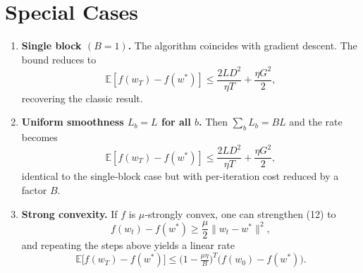\documentclass{article}
\newcommand{\E}{\mathbb{E}}
\begin{document}
\section*{Special Cases}
\begin{enumerate}[label=\arabic*)]
\item \textbf{Single block $(B=1)$.} The algorithm coincides with gradient descent. The bound reduces to
\[
\E[f(w_{T})-f(w^{*})]\le \frac{2L D^{2}}{\eta T}+\frac{\eta G^{2}}{2},
\]
recovering the classic result.
\item \textbf{Uniform smoothness $L_{b}=L$ for all $b$.} Then $\sum_{b}L_{b}=BL$ and the rate becomes
\[
\E[f(w_{T})-f(w^{*})]\le
\frac{2L D^{2}}{\eta T}+\frac{\eta G^{2}}{2},
\]
identical to the single‑block case but with per‑iteration cost reduced by a factor $B$.
\item \textbf{Strong convexity.} If $f$ is $\mu$‑strongly convex, one can strengthen (12) to
\[
f(w_{t})-f(w^{*})\ge \frac{\mu}{2}\|w_{t}-w^{*}\|^{2},
\]
and repeating the steps above yields a linear rate
\[
\E\!\big[f(w_{T})-f(w^{*})\big]\le
\big(1-\tfrac{\mu\eta}{B}\big)^{T}\big(f(w_{0})-f(w^{*})\big).
\]
\end{enumerate}
\end{document}
